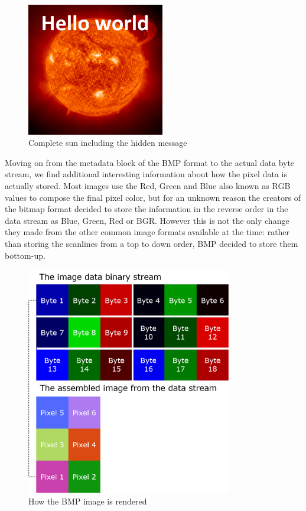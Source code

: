 \begin{itemize}
\begin{figure}[H]
    \centering
    \includegraphics[width=6cm,keepaspectratio]{pics/height_modification_steganography_original}
    \caption{Complete sun including the hidden message}
    \label{Sun_Original}
\end{figure}
\end{itemize}

Moving on from the metadata block of the BMP format to the actual data byte stream, we find additional interesting information about how the pixel data is actually stored. Most images use the Red, Green and Blue also known as RGB values to compose the final pixel color, but for an unknown reason the creators of the bitmap format decided to store the information in the reverse order in the data stream as Blue, Green, Red or BGR. However this is not the only change they made from the other common image formats available at the time: rather than storing the scanlines from a top to down order, BMP decided to store them bottom-up.

\begin{figure}[H]
    \centering
    \includegraphics[width=9cm,keepaspectratio]{pics/assembling_bmp_image}
    \caption{How the BMP image is rendered}
    \label{bmp_how_to_render}
\end{figure}

